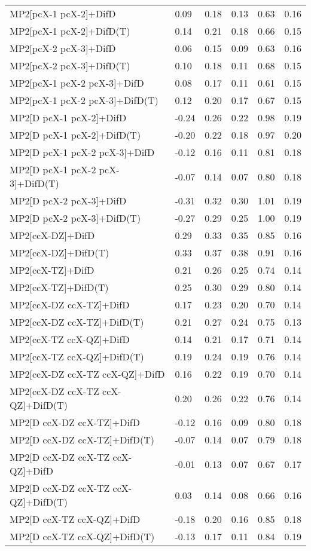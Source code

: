 \begin{table}
\begin{tabular}{l l l l l l }
    MP2[pcX-1 pcX-2]+DifD & 0.09 & 0.18 & 0.13 & 0.63 & 0.16 \\ 
    MP2[pcX-1 pcX-2]+DifD(T) & 0.14 & 0.21 & 0.18 & 0.66 & 0.15 \\ 
    MP2[pcX-2 pcX-3]+DifD & 0.06 & 0.15 & 0.09 & 0.63 & 0.16 \\ 
    MP2[pcX-2 pcX-3]+DifD(T) & 0.10 & 0.18 & 0.11 & 0.68 & 0.15 \\ 
    MP2[pcX-1 pcX-2 pcX-3]+DifD & 0.08 & 0.17 & 0.11 & 0.61 & 0.15 \\ 
    MP2[pcX-1 pcX-2 pcX-3]+DifD(T) & 0.12 & 0.20 & 0.17 & 0.67 & 0.15 \\ 
    MP2[D pcX-1 pcX-2]+DifD & -0.24 & 0.26 & 0.22 & 0.98 & 0.19 \\ 
    MP2[D pcX-1 pcX-2]+DifD(T) & -0.20 & 0.22 & 0.18 & 0.97 & 0.20 \\ 
    MP2[D pcX-1 pcX-2 pcX-3]+DifD & -0.12 & 0.16 & 0.11 & 0.81 & 0.18 \\ 
    MP2[D pcX-1 pcX-2 pcX-3]+DifD(T) & -0.07 & 0.14 & 0.07 & 0.80 & 0.18 \\ 
    MP2[D pcX-2 pcX-3]+DifD & -0.31 & 0.32 & 0.30 & 1.01 & 0.19 \\ 
    MP2[D pcX-2 pcX-3]+DifD(T) & -0.27 & 0.29 & 0.25 & 1.00 & 0.19 \\ 
    MP2[ccX-DZ]+DifD & 0.29 & 0.33 & 0.35 & 0.85 & 0.16 \\ 
    MP2[ccX-DZ]+DifD(T) & 0.33 & 0.37 & 0.38 & 0.91 & 0.16 \\ 
    MP2[ccX-TZ]+DifD & 0.21 & 0.26 & 0.25 & 0.74 & 0.14 \\ 
    MP2[ccX-TZ]+DifD(T) & 0.25 & 0.30 & 0.29 & 0.80 & 0.14 \\ 
    MP2[ccX-DZ ccX-TZ]+DifD & 0.17 & 0.23 & 0.20 & 0.70 & 0.14 \\ 
    MP2[ccX-DZ ccX-TZ]+DifD(T) & 0.21 & 0.27 & 0.24 & 0.75 & 0.13 \\ 
    MP2[ccX-TZ ccX-QZ]+DifD & 0.14 & 0.21 & 0.17 & 0.71 & 0.14 \\ 
    MP2[ccX-TZ ccX-QZ]+DifD(T) & 0.19 & 0.24 & 0.19 & 0.76 & 0.14 \\ 
    MP2[ccX-DZ ccX-TZ ccX-QZ]+DifD & 0.16 & 0.22 & 0.19 & 0.70 & 0.14 \\ 
    MP2[ccX-DZ ccX-TZ ccX-QZ]+DifD(T) & 0.20 & 0.26 & 0.22 & 0.76 & 0.14 \\ 
    MP2[D ccX-DZ ccX-TZ]+DifD & -0.12 & 0.16 & 0.09 & 0.80 & 0.18 \\ 
    MP2[D ccX-DZ ccX-TZ]+DifD(T) & -0.07 & 0.14 & 0.07 & 0.79 & 0.18 \\ 
    MP2[D ccX-DZ ccX-TZ ccX-QZ]+DifD & -0.01 & 0.13 & 0.07 & 0.67 & 0.17 \\ 
    MP2[D ccX-DZ ccX-TZ ccX-QZ]+DifD(T) & 0.03 & 0.14 & 0.08 & 0.66 & 0.16 \\ 
    MP2[D ccX-TZ ccX-QZ]+DifD & -0.18 & 0.20 & 0.16 & 0.85 & 0.18 \\ 
    MP2[D ccX-TZ ccX-QZ]+DifD(T) & -0.13 & 0.17 & 0.11 & 0.84 & 0.19 \\ 
    \bottomrule
  \end{tabular}
\end{table}
